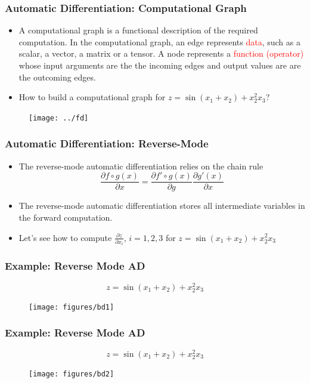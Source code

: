\documentclass{beamer}
\begin{document}
\begin{frame}
	\frametitle{Automatic Differentiation: Computational Graph}
	
	\begin{itemize}
		\item A computational graph is a functional description of the required computation. In the computational graph, an edge represents \textcolor{red}{data}, such as a scalar, a vector, a matrix or a tensor. A node represents a \textcolor{red}{function (operator)} whose input arguments are the the incoming edges and output values are are the outcoming edges. 
		\item How to build a computational graph for $z = \sin(x_1+x_2) + x_2^2 x_3$?
	\end{itemize}
	
	\begin{figure}[hbt]
  \texttt{[image: ../fd]}
\end{figure}
\end{frame}

\begin{frame}
	\frametitle{Automatic Differentiation: Reverse-Mode}
	
	\begin{itemize}
		\item The reverse-mode automatic differentiation relies on the chain rule 
		$$\frac{\partial f\circ g (x)}{\partial x} = \frac{\partial f'\circ g(x)}{\partial g} \frac{\partial g'(x)}{\partial x}$$
		\item The reverse-mode automatic differentiation stores all intermediate variables in the forward computation. 
		\item Let's see how to compute $\frac{\partial z}{\partial x_i}$, $i=1,2,3$ for $z = \sin(x_1+x_2) + x_2^2 x_3$
	\end{itemize}

\end{frame}


\begin{frame}
\frametitle{Example: Reverse Mode AD}	
$$z=\sin(x_1+x_2) + x_2^2x_3$$
\begin{figure}[hbt]
\centering
  \texttt{[image: figures/bd1]}
\end{figure}

  
\end{frame}

\begin{frame}
\frametitle{Example: Reverse Mode AD}	
$$z=\sin(x_1+x_2) + x_2^2x_3$$
\begin{figure}[hbt]
\centering
  \texttt{[image: figures/bd2]}
\end{figure}
\end{frame}
\end{document}
